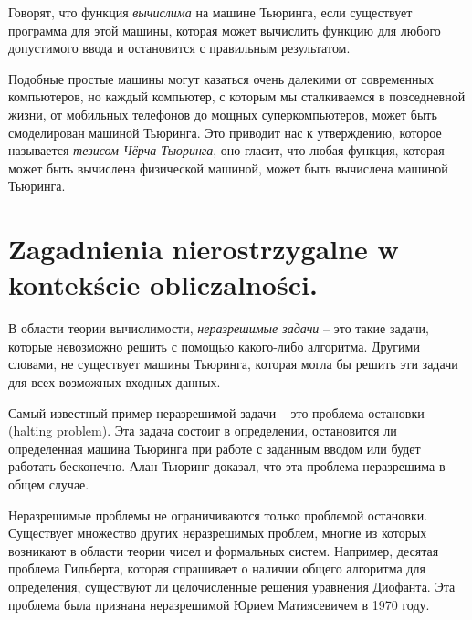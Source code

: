 Говорят, что функция \textit{вычислима} на машине Тьюринга, если существует программа для этой машины, которая может вычислить функцию для любого допустимого ввода и остановится с правильным результатом.

Подобные простые машины могут казаться очень далекими от современных компьютеров, но каждый компьютер, с которым мы сталкиваемся в повседневной жизни, от мобильных телефонов до мощных суперкомпьютеров, может быть смоделирован машиной Тьюринга. Это приводит нас к утверждению, которое называется \textit{тезисом Чёрча-Тьюринга}, оно гласит, что любая функция, которая может быть вычислена физической машиной, может быть вычислена машиной Тьюринга. 


\section{Zagadnienia nierostrzygalne w kontekście obliczalności.}



В области теории вычислимости, \textit{неразрешимые задачи} – это такие задачи, которые невозможно решить с помощью какого-либо алгоритма. Другими словами, не существует машины Тьюринга, которая могла бы решить эти задачи для всех возможных входных данных.

Самый известный пример неразрешимой задачи -- это проблема остановки (halting problem). Эта задача состоит в определении, остановится ли определенная машина Тьюринга при работе с заданным вводом или будет работать бесконечно. Алан Тьюринг доказал, что эта проблема неразрешима в общем случае.

Неразрешимые проблемы не ограничиваются только проблемой остановки. Существует множество других неразрешимых проблем, многие из которых возникают в области теории чисел и формальных систем. Например, десятая проблема Гильберта, которая спрашивает о наличии общего алгоритма для определения, существуют ли целочисленные решения уравнения Диофанта. Эта проблема была признана неразрешимой Юрием Матиясевичем в 1970 году.
 